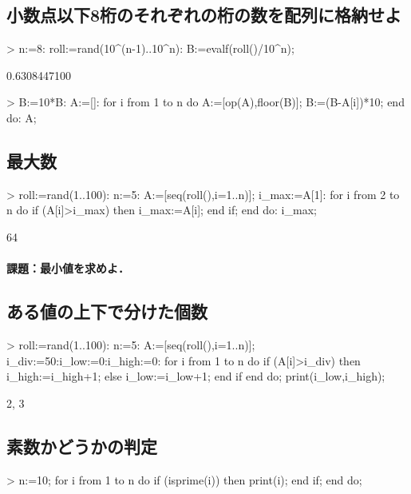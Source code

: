 \subsection{小数点以下8桁のそれぞれの桁の数を配列に格納せよ}
\begin{MapleInput}
> n:=8: 
  roll:=rand(10^(n-1)..10^n): 
  B:=evalf(roll()/10^n);
\end{MapleInput}
\begin{MapleError}
                                 0.6308447100
\end{MapleError}
\begin{MapleInput}
> B:=10*B:
  A:=[]:
  for i from 1 to n do
    A:=[op(A),floor(B)];
    B:=(B-A[i])*10;
  end do:
  A;
\end{MapleInput}
\begin{MapleOutput}
[6, 3, 0, 8, 4, 4, 7, 1]
\end{MapleOutput}

\subsection{最大数}
\begin{MapleInput}
> roll:=rand(1..100): 
  n:=5: 
  A:=[seq(roll(),i=1..n)]; 
  i_max:=A[1]: 
  for i from 2 to n do 
    if (A[i]>i_max) then 
      i_max:=A[i]; 
    end if; 
  end do: 
  i_max;
\end{MapleInput}
\begin{MapleError}
                                      64
\end{MapleError}
\paragraph{課題：最小値を求めよ．}

\subsection{ある値の上下で分けた個数}
\begin{MapleInput}
> roll:=rand(1..100): 
  n:=5: A:=[seq(roll(),i=1..n)];
  i_div:=50:i_low:=0:i_high:=0: 
  for i from 1 to n do 
    if (A[i]>i_div) then
      i_high:=i_high+1; 
    else 
      i_low:=i_low+1; 
    end if 
  end do; 
  print(i_low,i_high);
\end{MapleInput}
\begin{MapleError}
                                     2, 3
\end{MapleError}

\subsection{素数かどうかの判定}
\begin{MapleInput}
> n:=10; 
  for i from 1 to n do 
    if (isprime(i)) then 
      print(i); 
    end if; 
  end do;
\end{MapleInput}


